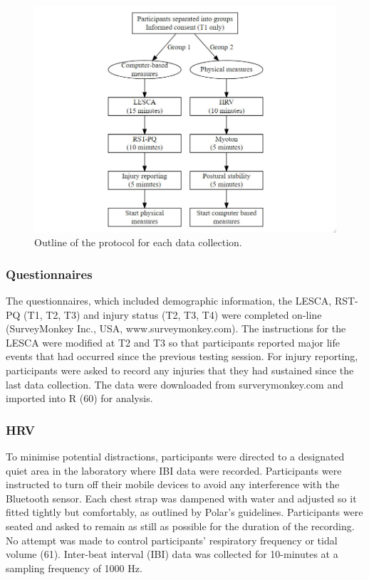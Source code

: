 \documentclass[
  english,
  man]{apa6}
\begin{document}
\begin{figure}

{\centering \includegraphics[width=1\linewidth]{figures_doc/Fig4} 

}

\caption{Outline of the protocol for each data collection.}\label{fig:fig4}
\end{figure}

\hypertarget{questionnaires}{%
\subsubsection{Questionnaires}\label{questionnaires}}

The questionnaires, which included demographic information, the LESCA, RST-PQ (T1, T2, T3) and injury status (T2, T3, T4) were completed on-line (SurveyMonkey Inc., USA, www.surveymonkey.com).
The instructions for the LESCA were modified at T2 and T3 so that participants reported major life events that had occurred since the previous testing session.
For injury reporting, participants were asked to record any injuries that they had sustained since the last data collection.
The data were downloaded from surverymonkey.com and imported into R (60) for analysis.

\hypertarget{hrv}{%
\subsubsection{HRV}\label{hrv}}

To minimise potential distractions, participants were directed to a designated quiet area in the laboratory where IBI data were recorded.
Participants were instructed to turn off their mobile devices to avoid any interference with the Bluetooth sensor.
Each chest strap was dampened with water and adjusted so it fitted tightly but comfortably, as outlined by Polar's guidelines.
Participants were seated and asked to remain as still as possible for the duration of the recording.
No attempt was made to control participants' respiratory frequency or tidal volume (61).
Inter-beat interval (IBI) data was collected for 10-minutes at a sampling frequency of 1000 Hz.
\end{document}
